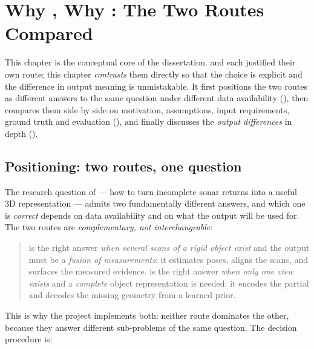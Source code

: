 \chapter{Why \routeA, Why \routeB: The Two Routes Compared}
\label{ch:comparison}

This chapter is the conceptual core of the dissertation. 
and  each justified their own route; this chapter
\emph{contrasts} them directly so that the choice is explicit and the
difference in output meaning is unmistakable. It first positions the two
routes as different answers to the same question under different data
availability (), then compares them side by side
on motivation, assumptions, input requirements, ground truth and evaluation
(), and finally discusses the \emph{output differences}
in depth ().

\section{Positioning: two routes, one question}
\label{sec:cmp_positioning}

The research question of  --- how to turn
incomplete sonar returns into a useful 3D representation --- admits two
fundamentally different answers, and which one is \emph{correct} depends on
data availability and on what the output will be used for. The two routes are
\emph{complementary, not interchangeable}:

\begin{quote}
\routeA{} is the right answer \emph{when several scans of a rigid object
exist} and the output must be a \emph{fusion of measurements}: it estimates
poses, aligns the scans, and surfaces the measured evidence. \routeB{} is the
right answer \emph{when only one view exists} and a \emph{complete} object
representation is needed: it encodes the partial and decodes the missing
geometry from a learned prior.
\end{quote}

This is why the project implements both: neither route dominates the other,
because they answer different sub-problems of the same question. The decision
procedure is:

